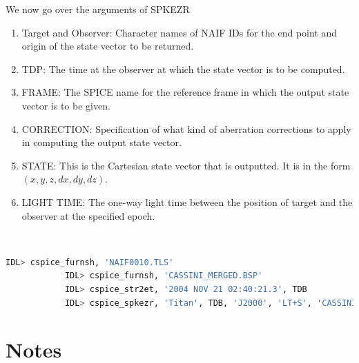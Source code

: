 \documentclass[crop=false,class=book]{standalone}
\begin{document}
            We now go over the arguments of SPKEZR
            \begin{enumerate}
                \item Target and Observer: Character names of NAIF IDs for the end point and origin of the state vector to be returned.
                \item TDP: The time at the observer at which the state vector is to be computed.
                \item FRAME: The SPICE name for the reference frame in which the output state vector is to be given.
                \item CORRECTION: Specification of what kind of aberration corrections to apply in computing the output state vector.
                \item STATE: This is the Cartesian state vector that is outputted. It is in the form $(x,y,z,dx,dy,dz)$. 
                \item LIGHT TIME: The one-way light time between the position of target and the observer at the specified epoch.
            \end{enumerate}
            \begin{example}
            \
            \begin{lstlisting}[language=bash,basicstyle=\footnotesize]
            IDL> cspice_furnsh, 'NAIF0010.TLS'
            IDL> cspice_furnsh, 'CASSINI_MERGED.BSP'
            IDL> cspice_str2et, '2004 NOV 21 02:40:21.3', TDB
            IDL> cspice_spkezr, 'Titan', TDB, 'J2000', 'LT+S', 'CASSINI', STATE, LT
            \end{lstlisting}
            \end{example}
\section{Notes}
\end{document}
